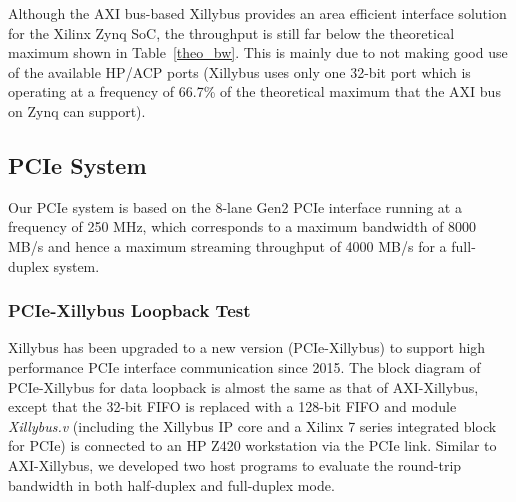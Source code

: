 \begin{table}[tb]
	\caption{Area overhead of AXI bus-based systems.}
	\label{xillybus_mxp_area}
	\centering
\end{table}

Although the AXI bus-based Xillybus provides an area efficient interface solution for the Xilinx Zynq SoC, the throughput is still far below the theoretical maximum shown in Table~\ref{theo_bw}. 
This is mainly due to not making good use of the available HP/ACP ports (Xillybus uses only one 32-bit port which is operating at a frequency of 66.7\% of the theoretical maximum that the AXI bus on Zynq can support). 


\subsection{PCIe System}
Our PCIe system is based on the 8-lane Gen2 PCIe interface running at a frequency of 250 MHz, which corresponds to a maximum bandwidth of 8000 MB/s and hence a maximum streaming throughput of 4000 MB/s for a full-duplex system. 

\subsubsection{PCIe-Xillybus Loopback Test}
Xillybus has been upgraded to a new version (PCIe-Xillybus) to support high performance PCIe interface communication since 2015. 
The block diagram of PCIe-Xillybus for data loopback is almost the same as that of AXI-Xillybus, except that the 32-bit FIFO is replaced with a 128-bit FIFO and module \textit{Xillybus.v} (including the Xillybus IP core and a Xilinx 7 series integrated block for PCIe) is connected to an HP Z420 workstation via the PCIe link. 
Similar to AXI-Xillybus, we developed two host programs to evaluate the round-trip bandwidth in both half-duplex and full-duplex mode. 

